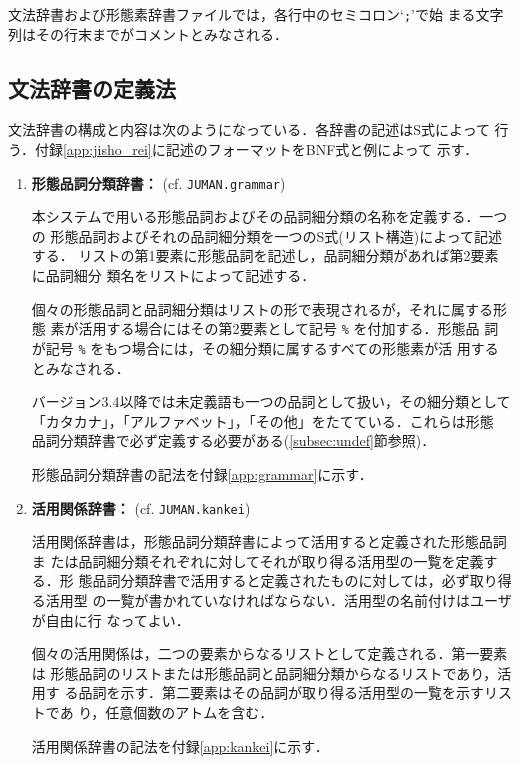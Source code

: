 \documentclass[a4j,titlepage]{jarticle}
\begin{document}
文法辞書および形態素辞書ファイルでは，各行中のセミコロン`{\tt ;}'で始
まる文字列はその行末までがコメントとみなされる．

\subsection{文法辞書の定義法}
\label{ss:jds-gd}

文法辞書の構成と内容は次のようになっている．各辞書の記述はS式によって
行う．付録\ref{app:jisho_rei}に記述のフォーマットをBNF式と例によって
示す．

\begin{enumerate}

\item\label{local:h_dict}
{\bf 形態品詞分類辞書：} (cf. {\tt JUMAN.grammar})

本システムで用いる形態品詞およびその品詞細分類の名称を定義する．一つの
形態品詞およびそれの品詞細分類を一つのS式(リスト構造)によって記述する．
リストの第1要素に形態品詞を記述し，品詞細分類があれば第2要素に品詞細分
類名をリストによって記述する．

個々の形態品詞と品詞細分類はリストの形で表現されるが，それに属する形態
素が活用する場合にはその第2要素として記号 {\tt \%} を付加する．形態品
詞が記号 {\tt \%} をもつ場合には，その細分類に属するすべての形態素が活
用するとみなされる．

バージョン3.4以降では未定義語も一つの品詞として扱い，その細分類として
「カタカナ」，「アルファベット」，「その他」をたてている．これらは形態
品詞分類辞書で必ず定義する必要がある(\ref{subsec:undef}節参照)．

形態品詞分類辞書の記法を付録\ref{app:grammar}に示す．

\item\label{local:r_dict}
{\bf 活用関係辞書：} (cf. {\tt JUMAN.kankei})

活用関係辞書は，形態品詞分類辞書によって活用すると定義された形態品詞ま
たは品詞細分類それぞれに対してそれが取り得る活用型の一覧を定義する．形
態品詞分類辞書で活用すると定義されたものに対しては，必ず取り得る活用型
の一覧が書かれていなければならない．活用型の名前付けはユーザが自由に行
なってよい．

個々の活用関係は，二つの要素からなるリストとして定義される．第一要素は
形態品詞のリストまたは形態品詞と品詞細分類からなるリストであり，活用す
る品詞を示す．第二要素はその品詞が取り得る活用型の一覧を示すリストであ
り，任意個数のアトムを含む．

活用関係辞書の記法を付録\ref{app:kankei}に示す．


\end{enumerate}
\end{document}

